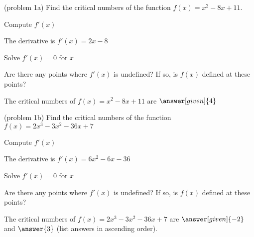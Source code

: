 \documentclass{ximera}
\begin{document}
\begin{problem}(problem 1a)
  Find the critical numbers of the function $f(x) = x^2 - 8x + 11$.
    \begin{hint}
      Compute $f'(x)$
    \end{hint}
    \begin{hint}
      The derivative is $f'(x) = 2x -8$
    \end{hint}
		\begin{hint}
      Solve $f'(x) = 0$ for $x$
    \end{hint}
    \begin{hint}
      Are there any points where $f'(x)$ is undefined?
      If so, is $f(x)$ defined at these points?  
		\end{hint}
    
    
		The critical numbers of $f(x) = x^2 - 8x + 11$ are
		 $\answer[given]{4}$
\end{problem}


\begin{problem}(problem 1b)
  Find the critical numbers of the function $f(x) = 2x^3 - 3x^2 -36x + 7$
    \begin{hint}
      Compute $f'(x)$
    \end{hint}
    \begin{hint}
      The derivative is $f'(x) = 6x^2 - 6x - 36$
    \end{hint}
		\begin{hint}
      Solve $f'(x) = 0$ for $x$
    \end{hint}
    \begin{hint}
      Are there any points where $f'(x)$ is undefined?
      If so, is $f(x)$ defined at these points?  
		\end{hint}
    
    
		The critical numbers of $f(x) = 2x^3 - 3x^2 -36x + 7$ are
		 $\answer[given]{-2}$ and $\answer{3}$ (list answers in ascending order).
		\end{problem}
\end{document}
